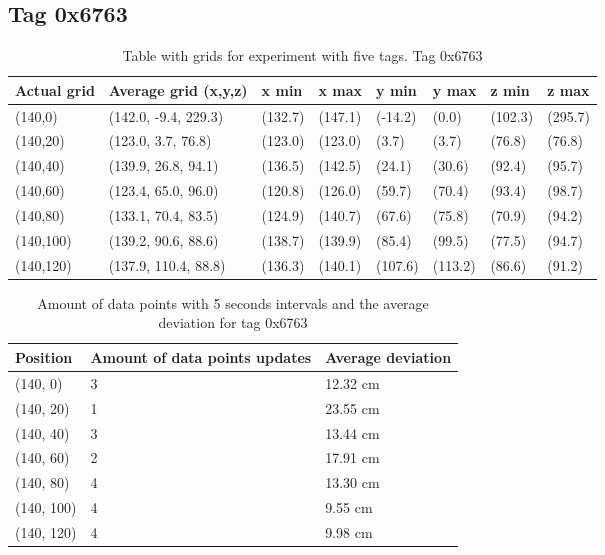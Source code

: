 \subsection{Tag 0x6763}
\begin{table}[H]
    \centering
    \begin{tabular}{|l|l|l|l|l|l|l|l|}
        \hline
        Actual grid & Average grid (x,y,z) & x min   & x max   & y min   & y max   & z min   & z max   \\ \hline
        (140,0)     & (142.0, -9.4, 229.3) & (132.7) & (147.1) & (-14.2) & (0.0)   & (102.3) & (295.7) \\ \hline
        (140,20)    & (123.0, 3.7, 76.8)   & (123.0) & (123.0) & (3.7)   & (3.7)   & (76.8)  & (76.8)  \\ \hline
        (140,40)    & (139.9, 26.8, 94.1)  & (136.5) & (142.5) & (24.1)  & (30.6)  & (92.4)  & (95.7)  \\ \hline
        (140,60)    & (123.4, 65.0, 96.0)  & (120.8) & (126.0) & (59.7)  & (70.4)  & (93.4)  & (98.7)  \\ \hline
        (140,80)    & (133.1, 70.4, 83.5)  & (124.9) & (140.7) & (67.6)  & (75.8)  & (70.9)  & (94.2)  \\ \hline
        (140,100)   & (139.2, 90.6, 88.6)  & (138.7) & (139.9) & (85.4)  & (99.5)  & (77.5)  & (94.7)  \\ \hline
        (140,120)   & (137.9, 110.4, 88.8) & (136.3) & (140.1) & (107.6) & (113.2) & (86.6)  & (91.2)  \\ \hline
    \end{tabular}
    \caption{Table with grids for experiment with five tags. Tag 0x6763}
\end{table}

\begin{table}[H]
    \centering
    \begin{tabular}{|l|l|l|}
        \hline
        Position   & Amount of data points updates & Average deviation \\ \hline
        (140, 0)   & 3                             & 12.32 cm          \\ \hline
        (140, 20)  & 1                             & 23.55 cm          \\ \hline
        (140, 40)  & 3                             & 13.44 cm          \\ \hline
        (140, 60)  & 2                             & 17.91 cm          \\ \hline
        (140, 80)  & 4                             & 13.30 cm          \\ \hline
        (140, 100) & 4                             & 9.55 cm           \\ \hline
        (140, 120) & 4                             & 9.98 cm           \\ \hline
    \end{tabular}
    \caption{Amount of data points with 5 seconds intervals and the average deviation for tag 0x6763}
\end{table}

